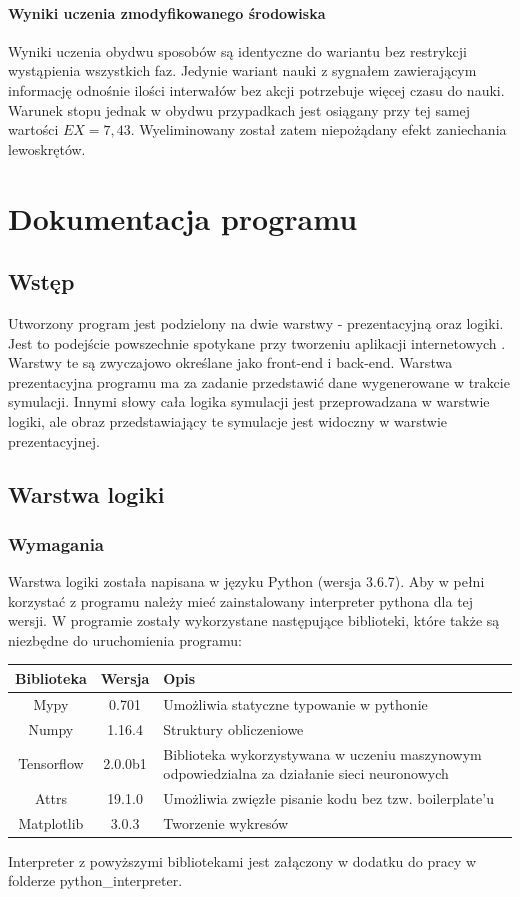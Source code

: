\documentclass[12pt]{book}
\theoremstyle{plain}
\begin{document}
\subsubsection*{Wyniki uczenia zmodyfikowanego środowiska}
Wyniki uczenia obydwu sposobów są identyczne do wariantu bez restrykcji wystąpienia wszystkich faz. Jedynie wariant nauki z sygnałem zawierającym informację odnośnie ilości interwałów bez akcji potrzebuje więcej czasu do nauki. Warunek stopu jednak w obydwu przypadkach jest osiągany przy tej samej wartości $EX=7,43$. Wyeliminowany został zatem niepożądany efekt zaniechania lewoskrętów.




\chapter{Dokumentacja programu} \label{chapter:docs}
\section{Wstęp}
Utworzony program jest podzielony na dwie warstwy - prezentacyjną oraz logiki. Jest to podejście powszechnie spotykane przy tworzeniu aplikacji internetowych \cite{frontend_backend}. Warstwy te są zwyczajowo określane jako front-end i back-end. Warstwa prezentacyjna programu ma za zadanie przedstawić dane wygenerowane w trakcie symulacji. Innymi słowy cała logika symulacji jest przeprowadzana w warstwie logiki, ale obraz przedstawiający te symulacje jest widoczny w warstwie prezentacyjnej. 
\section{Warstwa logiki}
\subsection{Wymagania}
Warstwa logiki została napisana w języku Python (wersja 3.6.7). Aby w pełni korzystać z programu należy mieć zainstalowany interpreter pythona dla tej wersji. W programie zostały wykorzystane następujące biblioteki, które także są niezbędne do uruchomienia programu: \newline \newline
\renewcommand{\arraystretch}{1.3}
\begin{tabular}{| c | c | L{5cm} |}
	\hline
	Biblioteka   &  Wersja & Opis \\	\hline
	Mypy & 0.701 & Umożliwia statyczne typowanie w pythonie \\ \hline
	Numpy & 1.16.4 & Struktury obliczeniowe \\ \hline
	Tensorflow & 2.0.0b1 &  Biblioteka wykorzystywana w uczeniu maszynowym odpowiedzialna za działanie sieci neuronowych \\ \hline
	Attrs & 19.1.0 & Umożliwia zwięzłe pisanie kodu bez tzw. boilerplate'u \\ \hline
	Matplotlib & 3.0.3 & Tworzenie wykresów \\ \hline
\end{tabular}\newline \newline
Interpreter z powyższymi bibliotekami jest załączony w dodatku do pracy w folderze python\_interpreter.
\end{document}
